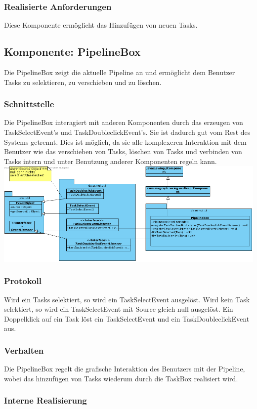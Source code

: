 \documentclass[a4paper,12pt]{scrartcl}
\begin{document}
\subsubsection{Realisierte Anforderungen}
Diese Komponente ermöglicht das Hinzufügen von neuen Tasks.

\subsection{Komponente: PipelineBox}
Die PipelineBox zeigt die aktuelle Pipeline an und ermöglicht dem Benutzer Tasks zu selektieren, zu verschieben und zu löschen. 
\subsubsection{Schnittstelle}
Die PipelineBox interagiert mit anderen Komponenten durch das erzeugen von TaskSelectEvent's und TaskDoubleclickEvent's.
Sie ist dadurch gut vom Rest des Systems getrennt. Dies ist möglich, da sie alle komplexeren Interaktion mit dem Benutzer wie das verschieben von Tasks, löschen von Tasks und verbinden von Tasks intern und unter Benutzung anderer Komponenten regeln kann.
\includegraphics[width=17cm]{Schnittstelle_PipelineBox.png}
\subsubsection{Protokoll}
Wird ein Tasks selektiert, so wird ein TaskSelectEvent ausgelöst. Wird kein Task selektiert, so wird ein TaskSelectEvent mit Source gleich null ausgelöst. Ein Doppelklick auf ein Task löst ein TaskSelectEvent und ein TaskDoubleclickEvent aus.
\subsubsection{Verhalten}
Die PipelineBox regelt die grafische Interaktion des Benutzers mit der Pipeline, wobei das hinzufügen von Tasks wiederum durch die TaskBox realisiert wird.
\subsubsection{Interne Realisierung}
\end{document}
